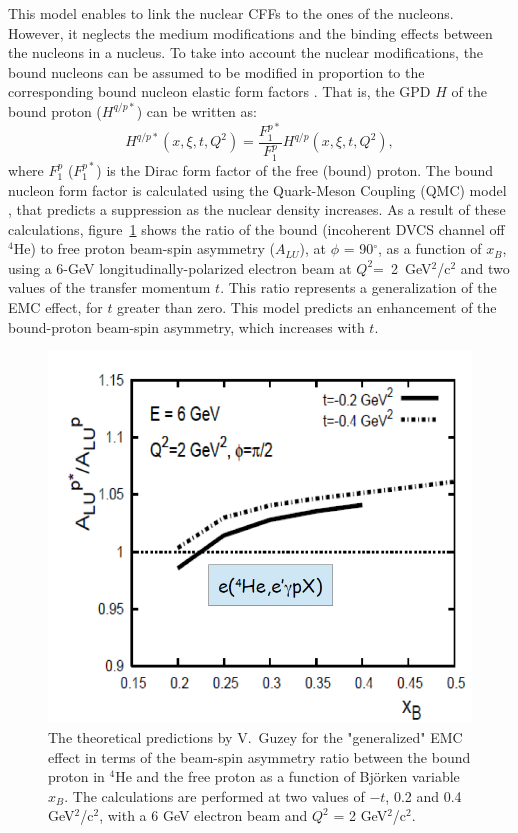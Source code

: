 This model enables to link the nuclear CFFs to the ones of the nucleons. However, it neglects the medium modifications and the binding effects between the nucleons in a nucleus. To take into account the nuclear modifications, the bound nucleons can be assumed to be modified in proportion to the corresponding bound nucleon elastic form factors \cite{EMC_vadim_2}. That is, the GPD $H$ of the bound proton ($H^{q/p*}$) can be written as:
\begin{equation}
H^{q/p*}(x,\xi,t, Q^2) = \frac{F^{p*}_{1}}{F^{p}_{1}} H^{q/p}(x,\xi,t, Q^2),
\end{equation}
where $F^{p}_{1}$ ($F^{p*}_{1}$) is the Dirac form factor of the free (bound) proton.
The bound nucleon form factor is calculated using the Quark-Meson Coupling (QMC) model \cite{QMC}, that predicts a suppression as the nuclear density increases. As a result of these calculations, figure~\ref{fig:EMC_vadim} shows the ratio of the bound (incoherent DVCS channel off $^4$He) to free proton beam-spin asymmetry ($A_{LU}$), at $\phi$ = 90$^{\circ}$, as a function of $x_B$, using a 6-GeV longitudinally-polarized electron beam at $Q^2$=~2~GeV$^2$/c$^2$ and two values of the transfer momentum $t$. This ratio represents a generalization of the EMC effect, for $t$ greater than zero. This model predicts an enhancement of the bound-proton beam-spin asymmetry, which increases with $t$.
\begin{figure}[tbp]
\centering
\includegraphics[scale=0.35]{fig/EMC_ALU_vadim.png}
\caption{The theoretical predictions by V.~Guzey \cite{EMC_vadim_2} for the 
"generalized" EMC effect in terms of the beam-spin asymmetry ratio between the 
bound proton in $^4$He and the free proton as a function of Bj\"orken variable 
$x_B$. The calculations are performed at two values of $-t$, 0.2 and 0.4 
GeV$^2$/c$^2$, with a 6 GeV electron beam and $Q^2$ = 2 GeV$^2$/c$^2$. } 
\label{fig:EMC_vadim}
\end{figure}

